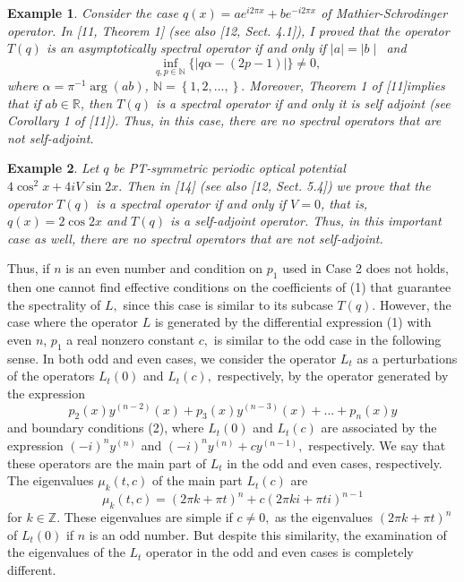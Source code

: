 \documentclass{article}%
\newtheorem{example}{Example}
\begin{document}
\begin{example}
Consider the case $q(x)=ae^{i2\pi x}+be^{-i2\pi x}$ of Mathier-Schrodinger
operator. In [11, Theorem 1] (see also [12, Sect. 4.1]), I proved that the
operator $T(q)$ is an asymptotically spectral operator if and only if $\mid
a\mid=\mid b\mid$\ and
\[
\text{ }\inf_{q,p\in\mathbb{N}}\{\mid q\alpha-(2p-1)\mid\}\neq0,
\]
where $\alpha=\pi^{-1}\arg(ab)$, $\mathbb{N=}\left\{  1,2,...,\right\}  .$
Moreover, Theorem 1 of [11]implies that if $ab\in\mathbb{R}$, then $T(q)$ is a
spectral operator if and only it is self adjoint (see Corollary 1 of [11]).
Thus, in this case, there are no spectral operators that are not self-adjoint.
\end{example}

\begin{example}
Let $q$ be PT-symmetric periodic optical potential $4\cos^{2}x+4iV\sin2x.$
Then in [14] (see also [12, Sect. 5.4]) we prove that the operator $T(q)$ is a
spectral operator if and only if $V=0$, that is, $q(x)=2\cos2x$ and $T(q)$ is
a self-adjoint operator. Thus, in this important case as well, there are no
spectral operators that are not self-adjoint.
\end{example}

Thus, if $n$ is an even number and condition on $p_{1}$ used in Case 2 does
not holds, then one cannot find effective conditions on the coefficients of
(1) that guarantee the spectrality of $L,$ since this case is similar to its
subcase $T(q).$ However, the case where the operator $L$ is generated by the
differential expression (1) with even $n$, $p_{1}$ a real nonzero constant
$c,$ is similar to the odd case in the following sense. In both odd and even
cases, we consider the operator $L_{t}$ as a perturbations of the operators
$L_{t}(0)$ and $L_{t}(c),$ respectively, by the operator generated by the
expression
\begin{equation}
p_{2}(x)y^{(n-2)}(x)+p_{3}\left(  x\right)  y^{(n-3)}(x)+...+p_{n}(x)y \tag{6}%
\end{equation}
and boundary conditions (2), where $L_{t}(0)$ and $L_{t}(c)$ are associated by
the expression $(-i)^{n}y^{(n)}$ and $(-i)^{n}y^{(n)}+cy^{(n-1)},$
respectively. We say that these operators are the main part of $L_{t}$ in the
odd and even cases, respectively. The eigenvalues $\mu_{k}(t,c)$ of the main
part $L_{t}(c)$ are
\begin{equation}
\mu_{k}(t,c)=(2\pi k+\pi t)^{n}+c(2\pi ki+\pi ti)^{n-1} \tag{7}%
\end{equation}
for $k\in\mathbb{Z}.$ These eigenvalues are simple if $c\neq0,$ as the
eigenvalues $(2\pi k+\pi t)^{n}$ of $L_{t}(0)$ if $n$ is an odd number. But
despite this similarity, the examination of the eigenvalues {}{}of the $L_{t}$
operator in the odd and even cases is completely different.
\end{document}
